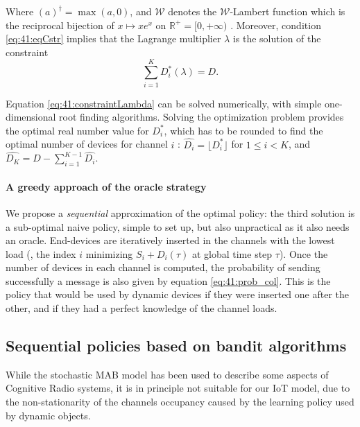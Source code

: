 Where $(a)^{\dag} = \max(a,0)$, and $\mathcal{W}$ denotes the $\mathcal{W}$-Lambert function which is the reciprocal bijection of $x \mapsto xe^x$ on $\mathbb{R^+} = [0, +\infty)$ \cite{Corless96}.
Moreover, condition \eqref{eq:41:eqCstr} implies that the Lagrange multiplier $\lambda$ is the solution of the constraint
\begin{equation}\label{eq:41:constraintLambda}
 \sum_{i=1}^{K} D_i^*(\lambda) = D.
\end{equation}


Equation \eqref{eq:41:constraintLambda} can be solved numerically, with simple one-dimensional root finding algorithms.
Solving the optimization problem provides the optimal real number value for $D_i^*$, which has to be rounded to find the optimal number of devices for channel $i$ :
$\widehat{D_i} = \lfloor D_i^* \rfloor$ for $1 \leq i < K$, and $\widehat{D_{K}} = D - \sum_{i=1}^{K - 1} \widehat{D_i}$.

\paragraph{A greedy approach of the oracle strategy}

We propose a \emph{sequential} approximation of the optimal policy:
the third solution is a sub-optimal naive policy, simple to set up, but also unpractical as it also needs an oracle.
End-devices are iteratively inserted in the channels with the lowest load (\ie, the index $i$ minimizing $S_i + D_i(\tau)$ at global time step $\tau$). Once the number of devices in each channel is computed, the probability of sending successfully a message is also given by equation \eqref{eq:41:prob_col}.
This is the policy that would be used by dynamic devices if they were inserted one after the other, and if they had a perfect knowledge of the channel loads.

\subsection{Sequential policies based on bandit algorithms}\label{sub:41:sequentialPolicies}

While the stochastic MAB model has been used to describe some aspects of Cognitive Radio systems, it is in principle not suitable for our IoT model, due to the non-stationarity of the channels occupancy caused by the learning policy used by dynamic objects.


